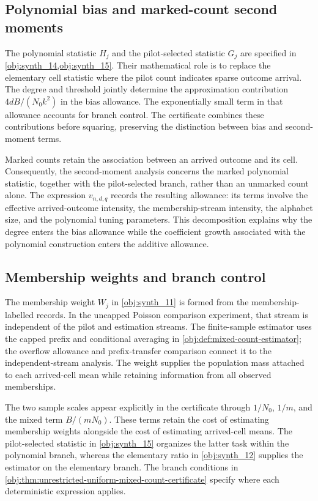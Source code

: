 \documentclass[11pt]{article}
\begin{document}
\subsection{Polynomial bias and marked-count second moments}

The polynomial statistic \(H_j\) and the pilot-selected statistic \(G_j\) are specified in \cref{obj:synth_14,obj:synth_15}. Their mathematical role is to replace the elementary cell statistic where the pilot count indicates sparse outcome arrival. The degree and threshold jointly determine the approximation contribution \(4dB/(N_0k^2)\) in the bias allowance. The exponentially small term in that allowance accounts for branch control. The certificate combines these contributions before squaring, preserving the distinction between bias and second-moment terms.

Marked counts retain the association between an arrived outcome and its cell. Consequently, the second-moment analysis concerns the marked polynomial statistic, together with the pilot-selected branch, rather than an unmarked count alone. The expression \(v_{n,d,q}\) records the resulting allowance: its terms involve the effective arrived-outcome intensity, the membership-stream intensity, the alphabet size, and the polynomial tuning parameters. This decomposition explains why the degree enters the bias allowance while the coefficient growth associated with the polynomial construction enters the additive allowance.

\subsection{Membership weights and branch control}

The membership weight \(W_j\) in \cref{obj:synth_11} is formed from the membership-labelled records. In the uncapped Poisson comparison experiment, that stream is independent of the pilot and estimation streams. The finite-sample estimator uses the capped prefix and conditional averaging in \cref{obj:def:mixed-count-estimator}; the overflow allowance and prefix-transfer comparison connect it to the independent-stream analysis. The weight supplies the population mass attached to each arrived-cell mean while retaining information from all observed memberships.

The two sample scales appear explicitly in the certificate through \(1/N_0\), \(1/m\), and the mixed term \(B/(mN_0)\). These terms retain the cost of estimating membership weights alongside the cost of estimating arrived-cell means. The pilot-selected statistic in \cref{obj:synth_15} organizes the latter task within the polynomial branch, whereas the elementary ratio in \cref{obj:synth_12} supplies the estimator on the elementary branch. The branch conditions in \cref{obj:thm:unrestricted-uniform-mixed-count-certificate} specify where each deterministic expression applies.
\end{document}
